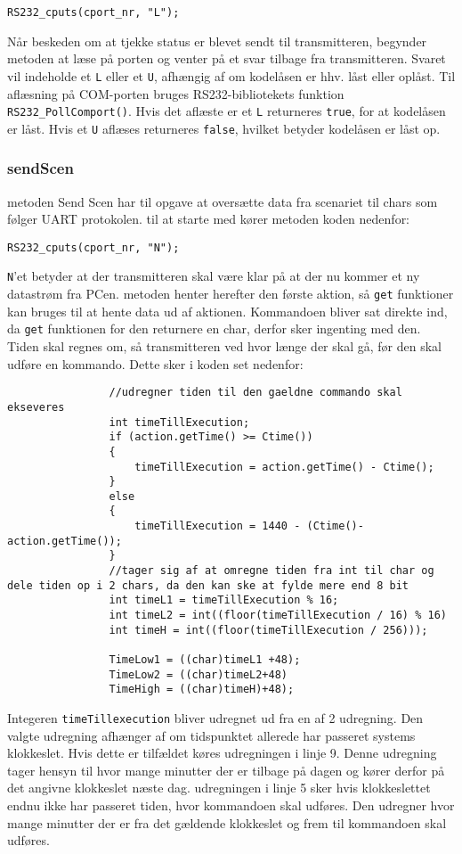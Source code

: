 \begin{lstlisting}
RS232_cputs(cport_nr, "L");
\end{lstlisting} 

Når beskeden om at tjekke status er blevet sendt til transmitteren, begynder metoden at læse på porten og venter på et svar tilbage fra transmitteren. Svaret vil indeholde et \texttt{L} eller et \texttt{U}, afhængig af om kodelåsen er hhv. låst eller oplåst. Til aflæsning på COM-porten bruges RS232-bibliotekets funktion \texttt{RS232\_PollComport()}.
Hvis det aflæste er et \texttt{L} returneres \texttt{true}, for at kodelåsen er låst. Hvis et \texttt{U} aflæses returneres \texttt{false}, hvilket betyder kodelåsen er låst op.

\subsubsection{sendScen}
metoden Send Scen har til opgave at oversætte data fra scenariet til chars som følger UART protokolen.
til at starte med kører metoden koden nedenfor:
\begin{lstlisting}
RS232_cputs(cport_nr, "N");
\end{lstlisting} 
\texttt{N}'et betyder at der transmitteren skal være klar på at der nu kommer et ny datastrøm fra PCen. 
metoden henter herefter den første aktion, så \texttt{get} funktioner kan bruges til at hente data ud af aktionen.
Kommandoen bliver sat direkte ind, da \texttt{get} funktionen for den returnere en char, derfor sker ingenting med den. 
Tiden skal regnes om, så transmitteren ved hvor længe der skal gå, før den skal udføre en kommando. Dette sker i koden set nedenfor:
\begin{lstlisting}
				//udregner tiden til den gaeldne commando skal ekseveres
				int timeTillExecution;
				if (action.getTime() >= Ctime())
				{
					timeTillExecution = action.getTime() - Ctime();
				}
				else
				{ 
					timeTillExecution = 1440 - (Ctime()-action.getTime()); 
				}
				//tager sig af at omregne tiden fra int til char og dele tiden op i 2 chars, da den kan ske at fylde mere end 8 bit
				int timeL1 = timeTillExecution % 16; 
				int timeL2 = int((floor(timeTillExecution / 16) % 16)
				int timeH = int((floor(timeTillExecution / 256)));

				TimeLow1 = ((char)timeL1 +48);
				TimeLow2 = ((char)timeL2+48)
				TimeHigh = ((char)timeH)+48);
\end{lstlisting} 
Integeren \texttt{timeTillexecution} bliver udregnet ud fra en af 2 udregning. Den valgte udregning afhænger af om tidspunktet allerede har passeret systems klokkeslet. Hvis dette er tilfældet køres udregningen i linje 9. Denne udregning tager hensyn til hvor mange minutter der er tilbage på dagen og kører derfor på det angivne klokkeslet næste dag. udregningen i linje 5 sker hvis klokkeslettet endnu ikke har passeret tiden, hvor kommandoen skal udføres. Den udregner hvor mange minutter der er fra det gældende klokkeslet og frem til kommandoen skal udføres.
